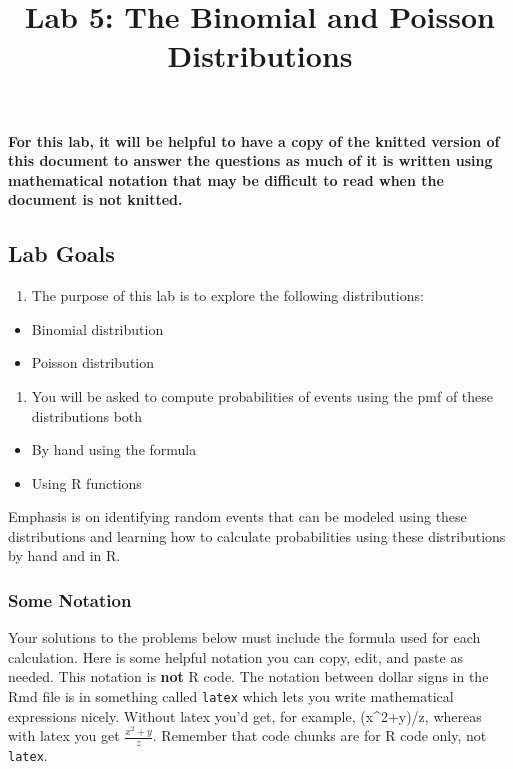 \documentclass[]{article}
\title{Lab 5: The Binomial and Poisson Distributions}
\author{}
\date{}
\providecommand{\tightlist}{%
  \setlength{\itemsep}{0pt}\setlength{\parskip}{0pt}}
\begin{document}
\maketitle

\textbf{For this lab, it will be helpful to have a copy of the knitted
version of this document to answer the questions as much of it is
written using mathematical notation that may be difficult to read when
the document is not knitted.}

\hypertarget{lab-goals}{%
\subsection{Lab Goals}\label{lab-goals}}

\begin{enumerate}
\def\labelenumi{\arabic{enumi}.}
\tightlist
\item
  The purpose of this lab is to explore the following distributions:
\end{enumerate}

\begin{itemize}
\item
  Binomial distribution
\item
  Poisson distribution
\end{itemize}

\begin{enumerate}
\def\labelenumi{\arabic{enumi}.}
\setcounter{enumi}{1}
\tightlist
\item
  You will be asked to compute probabilities of events using the pmf of
  these distributions both
\end{enumerate}

\begin{itemize}
\item
  By hand using the formula
\item
  Using R functions
\end{itemize}

Emphasis is on identifying random events that can be modeled using these
distributions and learning how to calculate probabilities using these
distributions by hand and in R.

\hypertarget{some-notation}{%
\subsubsection{Some Notation}\label{some-notation}}

Your solutions to the problems below must include the formula used for
each calculation. Here is some helpful notation you can copy, edit, and
paste as needed. This notation is \textbf{not} R code. The notation
between dollar signs in the Rmd file is in something called
\texttt{latex} which lets you write mathematical expressions nicely.
Without latex you'd get, for example, (x\^{}2+y)/z, whereas with latex
you get \(\frac{x^2+y}{z}\). Remember that code chunks are for R code
only, not \texttt{latex}.
\end{document}
